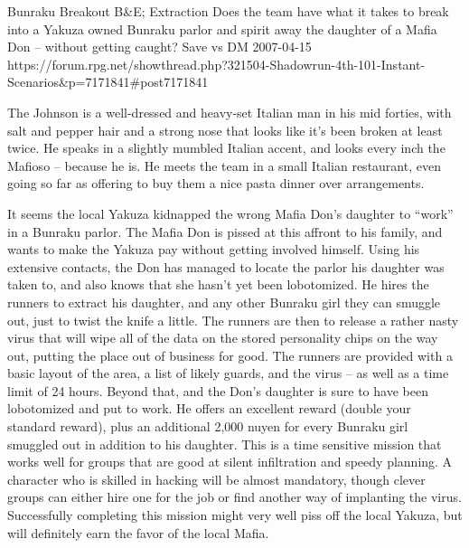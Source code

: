 \begin{scenario}{Bunraku Breakout}
	{B\&E; Extraction}
	{Does the team have what it takes to break into a Yakuza owned Bunraku parlor and spirit away the daughter of a Mafia Don – without getting caught?}
	{Save vs DM}
	{2007-04-15}
	{https://forum.rpg.net/showthread.php?321504-Shadowrun-4th-101-Instant-Scenarios\&p=7171841#post7171841}

 The Johnson is a well-dressed and heavy-set Italian man in his mid forties, with salt and pepper hair and a strong nose that looks like it’s been broken at least twice. He speaks in a slightly mumbled Italian accent, and looks every inch the Mafioso – because he is. He meets the team in a small Italian restaurant, even going so far as offering to buy them a nice pasta dinner over arrangements.

\synopsis It seems the local Yakuza kidnapped the wrong Mafia Don’s daughter to “work” in a Bunraku parlor. The Mafia Don is pissed at this affront to his family, and wants to make the Yakuza pay without getting involved himself. Using his extensive contacts, the Don has managed to locate the parlor his daughter was taken to, and also knows that she hasn’t yet been lobotomized. He hires the runners to extract his daughter, and any other Bunraku girl they can smuggle out, just to twist the knife a little. The runners are then to release a rather nasty virus that will wipe all of the data on the stored personality chips on the way out, putting the place out of business for good. The runners are provided with a basic layout of the area, a list of likely guards, and the virus – as well as a time limit of 24 hours. Beyond that, and the Don’s daughter is sure to have been lobotomized and put to work. He offers an excellent reward (double your standard reward), plus an additional 2,000 nuyen for every Bunraku girl smuggled out in addition to his daughter.
\notes  This is a time sensitive mission that works well for groups that are good at silent infiltration and speedy planning. A character who is skilled in hacking will be almost mandatory, though clever groups can either hire one for the job or find another way of implanting the virus. Successfully completing this mission might very well piss off the local Yakuza, but will definitely earn the favor of the local Mafia.

\end{scenario}